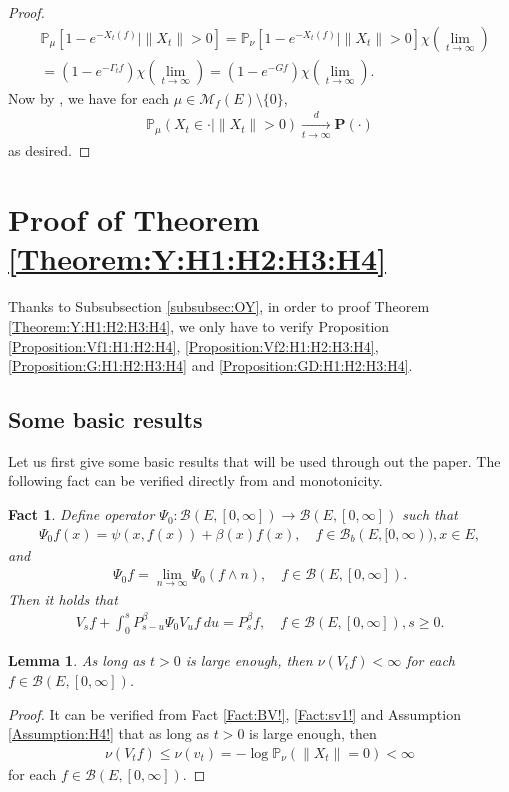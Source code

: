 \documentclass[12pt,a4paper]{amsart}
\numberwithin{equation}{section}
\theoremstyle{plain}
\newtheorem{lem}[thm]{Lemma}
\newtheorem{fact}[thm]{Fact}
\theoremstyle{definition}
\theoremstyle{remark}
\begin{document}
\begin{proof}
\begin{align}
  &\mathbb P_\mu [1 - e^{-X_t(f)}|\|X_t\|>0]
 = \mathbb P_\nu [1 - e^{-X_t(f)}|\|X_t\|>0] \chi(\lim_{t\to \infty})
 \\&= (1 - e^{- \Gamma_t f}) \chi(\lim_{t\to \infty})
 = (1 - e^{-Gf}) \chi(\lim_{t\to \infty}).
 \end{align}
Now by \cite[Proposition 1.19]{Li2011MeasureValued}, we have for each $\mu \in \mathcal M_f(E)\setminus\{0\}$,
\begin{align}
 \mathbb P_\mu(X_t \in \cdot | \|X_t\|>0) 
 \xrightarrow[t\to \infty]{d} \mathbf P(\cdot)
 \end{align}
as desired.
\end{proof}
\section{Proof of Theorem \ref{Theorem:Y:H1:H2:H3:H4}}
Thanks to Subsubsection \ref{subsubsec:OY}, in order to proof Theorem \ref{Theorem:Y:H1:H2:H3:H4}, we only have to verify Proposition \ref{Proposition:Vf1:H1:H2:H4}, \ref{Proposition:Vf2:H1:H2:H3:H4}, \ref{Proposition:G:H1:H2:H3:H4} and \ref{Proposition:GD:H1:H2:H3:H4}. 
\subsection{Some basic results} 
Let us first give some basic results that will be used through out the paper.
The following fact can be verified directly from \cite[Theorem 2.23]{Li2011MeasureValued} and monotonicity.
\begin{fact} \label{Fact:P!}
Define operator $\Psi_0: \mathcal B(E, [0,\infty]) \to \mathcal B(E,[0,\infty])$ such that 
\begin{align}
 \Psi_0 f(x) 
 = \psi(x,f(x))+\beta(x)f(x), 
 \quad f\in \mathcal B_b(E,[0,\infty)), x\in E,
 \end{align}
and 
\begin{align}
 \Psi_0 f 
 = \lim_{n\to \infty} \Psi_0 (f\wedge n), \quad f\in \mathcal B(E,[0,\infty]).
 \end{align}
Then it holds that
\begin{align}
 V_s f + \int_0^s P_{s-u}^\beta \Psi_0 V_{u} f ~du
 = P_s^\beta f, 
 \quad f\in \mathcal B(E,[0,\infty]), s\geq 0.
 \end{align}
\end{fact}
\begin{lem} \label{Lemma:nV:H4} 
As long as $t>0$ is large enough, then $\nu(V_tf) < \infty$ for each $f\in \mathcal B(E, [0,\infty])$.
\end{lem}
\begin{proof}
It can be verified from Fact \ref{Fact:BV!}, \ref{Fact:sv1!} and Assumption \ref{Assumption:H4!} that as long as $t>0$ is large enough, then
\begin{align}
 \nu(V_t f) \leq \nu(v_t)  
 = - \log \mathbb P_\nu (\|X_t\| = 0) 
 < \infty
 \end{align}
for each $f\in \mathcal B(E,[0,\infty])$.
\end{proof}
\end{document}
